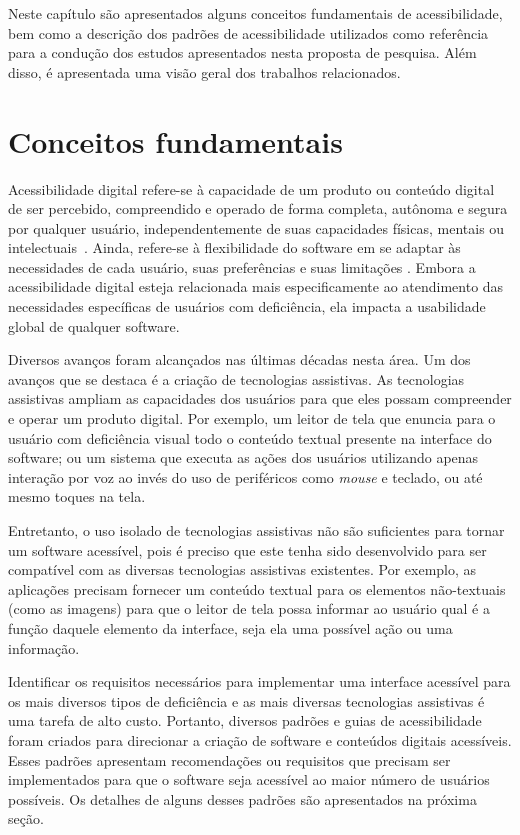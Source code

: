 
Neste capítulo são apresentados alguns conceitos fundamentais de acessibilidade, bem como a descrição dos padrões de acessibilidade utilizados como referência para a condução dos estudos apresentados nesta proposta de pesquisa. Além disso, é apresentada uma visão geral dos trabalhos relacionados.

\section{Conceitos fundamentais}

Acessibilidade digital refere-se à capacidade de um produto ou conteúdo digital de ser percebido, compreendido e operado de forma completa, autônoma e segura por qualquer usuário, independentemente de suas capacidades físicas, mentais ou intelectuais~\cite{w3cwai}. Ainda, refere-se à flexibilidade do software em se adaptar às necessidades de cada usuário, suas preferências e suas limitações \cite{camilamaster}. 
Embora a acessibilidade digital esteja relacionada mais especificamente ao atendimento das necessidades específicas de usuários com deficiência, ela impacta a usabilidade global de qualquer software.

Diversos avanços foram alcançados nas últimas décadas nesta área. Um dos avanços que se destaca é a criação de tecnologias assistivas. As tecnologias assistivas ampliam as capacidades dos usuários para que eles possam compreender e operar um produto digital. Por exemplo, um leitor de tela que enuncia para o usuário com deficiência visual todo o conteúdo textual presente na interface do software; ou um sistema que executa as ações dos usuários utilizando apenas interação por voz ao invés do uso de periféricos como \textit{mouse} e teclado, ou até mesmo toques na tela. 

Entretanto, o uso isolado de tecnologias assistivas não são suficientes para tornar um software acessível, pois é preciso que este tenha sido desenvolvido para ser compatível com as diversas tecnologias assistivas existentes. Por exemplo, as aplicações precisam fornecer um conteúdo textual para os elementos não-textuais (como as imagens) para que o leitor de tela possa informar ao usuário qual é a função daquele elemento da interface, seja ela uma possível ação ou uma informação.

Identificar os requisitos necessários para implementar uma interface acessível para os mais diversos tipos de deficiência e as mais diversas tecnologias assistivas é uma tarefa de alto custo. Portanto, diversos padrões e guias de acessibilidade foram criados para direcionar a criação de software e conteúdos digitais acessíveis. Esses padrões apresentam recomendações ou requisitos que precisam ser implementados para que o software seja acessível ao maior número de usuários possíveis. Os detalhes de alguns desses padrões são apresentados na próxima seção. 

